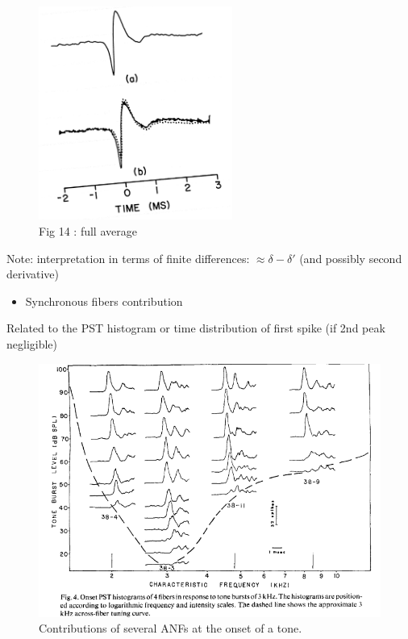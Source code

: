 \documentclass[]{article}
\providecommand{\tightlist}{%
  \setlength{\itemsep}{0pt}\setlength{\parskip}{0pt}}
\begin{document}
\begin{figure}
\centering
\includegraphics[width=2.5in,height=\textheight]{./figures/UR.png}
\caption{Fig 14 \citep{Wang1979} : full average}
\end{figure}

Note: interpretation in terms of finite differences:
\(\approx \delta - \delta'\) (and possibly second derivative)

\clearpage

\begin{itemize}
\tightlist
\item
  Synchronous fibers contribution
\end{itemize}

Related to the PST histogram or time distribution of first spike (if 2nd
peak negligible)

\begin{figure}
\centering
\includegraphics[width=5in,height=\textheight]{./figures/PST_tone.png}
\caption{Contributions of several ANFs at the onset of a tone.
\citep{Ozdamar1978}}
\end{figure}
\end{document}
